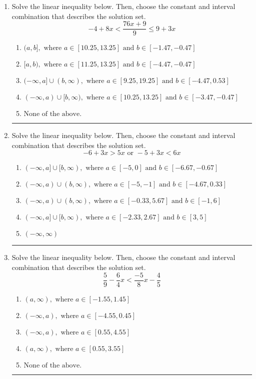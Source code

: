 \documentclass[14pt]{extbook}
\newcommand{\litem}[1]{\item#1\hspace*{-1cm}\rule{\textwidth}{0.4pt}}
\begin{document}
\begin{enumerate}
{\begin{enumerate}[label=\Alph*.]
\end{enumerate} }
\litem{
Solve the linear inequality below. Then, choose the constant and interval combination that describes the solution set.\[ -4 + 8 x < \frac{76 x + 9}{9} \leq 9 + 3 x \]\begin{enumerate}[label=\Alph*.]
\item \( (a, b], \text{ where } a \in [10.25, 13.25] \text{ and } b \in [-1.47, -0.47] \)
\item \( [a, b), \text{ where } a \in [11.25, 13.25] \text{ and } b \in [-4.47, -0.47] \)
\item \( (-\infty, a] \cup (b, \infty), \text{ where } a \in [9.25, 19.25] \text{ and } b \in [-4.47, 0.53] \)
\item \( (-\infty, a) \cup [b, \infty), \text{ where } a \in [10.25, 13.25] \text{ and } b \in [-3.47, -0.47] \)
\item \( \text{None of the above.} \)

\end{enumerate} }
\litem{
Solve the linear inequality below. Then, choose the constant and interval combination that describes the solution set.\[ -6 + 3 x > 5 x \text{ or } -5 + 3 x < 6 x \]\begin{enumerate}[label=\Alph*.]
\item \( (-\infty, a] \cup [b, \infty), \text{ where } a \in [-5, 0] \text{ and } b \in [-6.67, -0.67] \)
\item \( (-\infty, a) \cup (b, \infty), \text{ where } a \in [-5, -1] \text{ and } b \in [-4.67, 0.33] \)
\item \( (-\infty, a) \cup (b, \infty), \text{ where } a \in [-0.33, 5.67] \text{ and } b \in [-1, 6] \)
\item \( (-\infty, a] \cup [b, \infty), \text{ where } a \in [-2.33, 2.67] \text{ and } b \in [3, 5] \)
\item \( (-\infty, \infty) \)

\end{enumerate} }
\litem{
Solve the linear inequality below. Then, choose the constant and interval combination that describes the solution set.\[ \frac{5}{9} - \frac{6}{4} x < \frac{-5}{8} x - \frac{4}{5} \]\begin{enumerate}[label=\Alph*.]
\item \( (a, \infty), \text{ where } a \in [-1.55, 1.45] \)
\item \( (-\infty, a), \text{ where } a \in [-4.55, 0.45] \)
\item \( (-\infty, a), \text{ where } a \in [0.55, 4.55] \)
\item \( (a, \infty), \text{ where } a \in [0.55, 3.55] \)
\item \( \text{None of the above}. \)

\end{enumerate} }
\end{enumerate}
\end{document}
